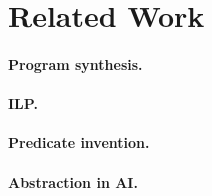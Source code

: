 \section{Related Work}

\paragraph{Program synthesis.}

\paragraph{ILP.}

\paragraph{Predicate invention.}

\paragraph{Abstraction in AI.}